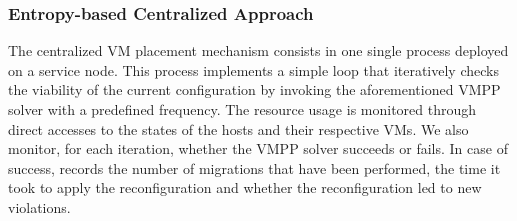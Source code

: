 \subsubsection{Entropy-based Centralized Approach}
\label{subsec:entropy}
The centralized VM placement mechanism consists in one single \sg
process deployed on a service node. This process implements a simple loop that
iteratively checks the viability of the current configuration by
invoking the aforementioned VMPP solver with a predefined
frequency.
%
The resource usage is monitored through direct accesses
to the states of the hosts and their respective VMs.
%
%
We also monitor, for each iteration, whether the VMPP solver succeeds
or fails. In case of success, \vmps records the number of migrations
that have been performed, the time it took to apply the
reconfiguration and whether the reconfiguration
led to new violations.

